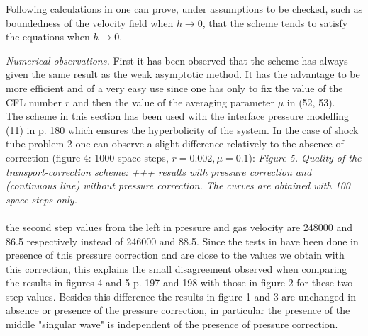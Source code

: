\documentclass[a4paper,12pt]{article}
\begin{document}
Following calculations in \cite{ColombeauSiam, ColombeauNMPDE} one can prove, under assumptions to be checked, such as boundedness of the velocity field when $h\rightarrow 0$, that the scheme tends to satisfy the equations when $h\rightarrow 0$.
 \begin{figure}[h]\centering\end{figure}
 



\textit{Numerical observations.} First it has been observed that the scheme has always given the same result as the weak asymptotic method. It has the advantage  to be more  efficient and of a very easy use since one has only to fix the value of the CFL number $r$ and then the value of the averaging parameter $\mu$ in (52, 53).\\



The scheme in this section has been used with the interface pressure modelling (11) in \cite{EvjeFlatten} p. 180 which ensures the hyperbolicity of the system. In the case of shock tube problem 2 one can observe a slight difference relatively to the absence of correction (figure 4: 1000 space steps, $r=0.002, \mu=0.1$):
\vskip9cm
\textit{Figure 5. Quality of the transport-correction scheme: +++ results with pressure correction and (continuous line) without pressure correction. The curves are obtained with 100 space steps only.}\\
\\
 the second step values from the left in pressure and gas velocity are 248000 and 86.5 respectively instead of 246000 and 88.5. Since the tests in \cite{EvjeFlatten} have been done in presence of this pressure correction and are  close to the values we obtain with this correction, this explains the small disagreement observed when comparing the results in \cite{EvjeFlatten} figures 4 and 5 p. 197 and 198  with those in figure 2 for these two step values. Besides this difference the results in figure 1 and 3 are unchanged in absence or presence of the pressure correction, in particular the presence of the middle "singular  wave" is independent of the presence of pressure correction.\\
\end{document}
